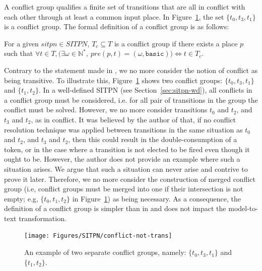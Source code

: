 A conflict group qualifies a finite set of transitions that are all in
conflict with each other through at least a common input place. In
Figure~\ref{fig:conflict-not-trans}, the set $\{t_0,t_3,t_1\}$ is a
conflict group.  The formal definition of a conflict group is as
follows:

\begin{definition}
  \label{def:cgroup}
  For a given $sitpn\in{}SITPN$, $T_c\subseteq{}T$ is a conflict group
  if there exists a place $p$ such that
  $\forall{}t\in{}T,\big(\exists{}\omega\in\mathbb{N}^{*},~pre(p,t)=(\omega,\mathtt{basic})\big)\Leftrightarrow{}t\in{}T_c$.
\end{definition}

Contrary to the statement made in \cite[p. 67]{Leroux2014}, we no more
consider the notion of conflict as being transitive. To illustrate
this, Figure~\ref{fig:conflict-not-trans} shows two conflict groups:
$\{t_0,t_3,t_1\}$ and $\{t_1,t_2\}$. In a well-defined SITPN (see
Section~\ref{sec:sitpn-wd}), all conflicts in a conflict group must be
considered, i.e. for all pair of transitions in the group the conflict
must be solved. However, we no more consider transitions $t_0$ and
$t_2$, and $t_3$ and $t_2$, as in conflict. It was believed by the
author of \cite{Leroux2014} that, if no conflict resolution technique
was applied between transitions in the same situation as $t_0$ and
$t_2$, and $t_3$ and $t_2$, then this could result in the
double-consumption of a token, or in the case where a transition is
not elected to be fired even though it ought to be. However, the
author does not provide an example where such a situation arises. We
argue that such a situation can never arise and contrive to prove it
later.  Therefore, we no more consider the construction of merged
conflict group (i.e, conflict groups must be merged into one if their
intersection is not empty; e.g, $\{t_0,t_1,t_2\}$ in
Figure~\ref{fig:conflict-not-trans}) as being necessary. As a
consequence, the definition of a conflict group is simpler than in
\cite{Leroux2014} and does not impact the \hilecop{} model-to-text
transformation.

\begin{figure}[H]
  \centering
  \texttt{[image: Figures/SITPN/conflict-not-trans]}
  \caption[An example of two separate conflict groups.]{An example of
    two separate conflict groups, namely: $\{t_0,t_3,t_1\}$ and
    $\{t_1,t_2\}$.}
  \label{fig:conflict-not-trans}
\end{figure}

